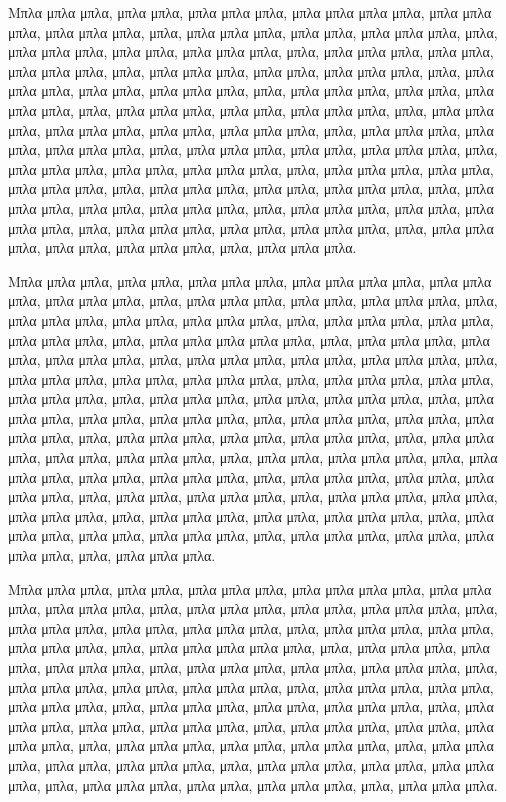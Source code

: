 \documentclass[diploma]{softlab-thesis}
\begin{document}
Μπλα μπλα μπλα, μπλα μπλα, μπλα μπλα μπλα, μπλα μπλα μπλα μπλα,
μπλα μπλα μπλα, μπλα μπλα μπλα, μπλα, μπλα μπλα μπλα, μπλα μπλα,
μπλα μπλα μπλα, μπλα, μπλα μπλα μπλα, μπλα μπλα, μπλα μπλα μπλα,
μπλα, μπλα μπλα μπλα, μπλα μπλα, μπλα μπλα μπλα, μπλα, μπλα μπλα
μπλα, μπλα μπλα, μπλα μπλα μπλα, μπλα, μπλα μπλα μπλα, μπλα μπλα,
μπλα μπλα μπλα, μπλα, μπλα μπλα μπλα, μπλα μπλα, μπλα μπλα μπλα,
μπλα, μπλα μπλα μπλα, μπλα μπλα, μπλα μπλα μπλα, μπλα, μπλα μπλα
μπλα, μπλα μπλα μπλα, μπλα μπλα, μπλα μπλα μπλα, μπλα, μπλα μπλα
μπλα, μπλα μπλα, μπλα μπλα μπλα, μπλα, μπλα μπλα μπλα, μπλα μπλα,
μπλα μπλα μπλα, μπλα, μπλα μπλα μπλα, μπλα μπλα, μπλα μπλα μπλα,
μπλα, μπλα μπλα μπλα, μπλα μπλα, μπλα μπλα μπλα, μπλα, μπλα μπλα
μπλα, μπλα μπλα, μπλα μπλα μπλα, μπλα, μπλα μπλα μπλα, μπλα μπλα,
μπλα μπλα μπλα, μπλα, μπλα μπλα μπλα, μπλα μπλα, μπλα μπλα μπλα,
μπλα, μπλα μπλα μπλα, μπλα μπλα, μπλα μπλα μπλα, μπλα, μπλα μπλα
μπλα, μπλα μπλα, μπλα μπλα μπλα, μπλα, μπλα μπλα μπλα.

Μπλα μπλα μπλα, μπλα μπλα, μπλα μπλα μπλα, μπλα μπλα μπλα μπλα,
μπλα μπλα μπλα, μπλα μπλα μπλα, μπλα, μπλα μπλα μπλα, μπλα μπλα,
μπλα μπλα μπλα, μπλα, μπλα μπλα μπλα, μπλα μπλα, μπλα μπλα μπλα,
μπλα, μπλα μπλα μπλα, μπλα μπλα, μπλα μπλα μπλα, μπλα, μπλα μπλα
μπλα μπλα μπλα, μπλα, μπλα μπλα μπλα, μπλα μπλα, μπλα μπλα μπλα,
μπλα, μπλα μπλα μπλα, μπλα μπλα, μπλα μπλα μπλα, μπλα, μπλα μπλα
μπλα, μπλα μπλα, μπλα μπλα μπλα, μπλα, μπλα μπλα μπλα, μπλα μπλα,
μπλα μπλα μπλα, μπλα, μπλα μπλα μπλα, μπλα μπλα, μπλα μπλα μπλα,
μπλα, μπλα μπλα μπλα, μπλα μπλα, μπλα μπλα μπλα, μπλα, μπλα μπλα
μπλα, μπλα μπλα, μπλα μπλα μπλα, μπλα, μπλα μπλα μπλα, μπλα μπλα,
μπλα μπλα μπλα, μπλα, μπλα μπλα μπλα, μπλα μπλα, μπλα μπλα μπλα,
μπλα, μπλα μπλα, μπλα μπλα μπλα, μπλα, μπλα μπλα μπλα, μπλα μπλα,
μπλα μπλα μπλα, μπλα, μπλα μπλα μπλα, μπλα μπλα, μπλα μπλα μπλα,
μπλα, μπλα μπλα, μπλα μπλα μπλα, μπλα, μπλα μπλα μπλα, μπλα μπλα,
μπλα μπλα μπλα, μπλα, μπλα μπλα μπλα, μπλα μπλα, μπλα μπλα μπλα,
μπλα, μπλα μπλα μπλα, μπλα μπλα, μπλα μπλα μπλα, μπλα, μπλα μπλα
μπλα, μπλα μπλα, μπλα μπλα μπλα, μπλα, μπλα μπλα μπλα.

Μπλα μπλα μπλα, μπλα μπλα, μπλα μπλα μπλα, μπλα μπλα μπλα μπλα,
μπλα μπλα μπλα, μπλα μπλα μπλα, μπλα, μπλα μπλα μπλα, μπλα μπλα,
μπλα μπλα μπλα, μπλα, μπλα μπλα μπλα, μπλα μπλα, μπλα μπλα μπλα,
μπλα, μπλα μπλα μπλα, μπλα μπλα, μπλα μπλα μπλα, μπλα, μπλα μπλα
μπλα μπλα μπλα, μπλα, μπλα μπλα μπλα, μπλα μπλα, μπλα μπλα μπλα,
μπλα, μπλα μπλα μπλα, μπλα μπλα, μπλα μπλα μπλα, μπλα, μπλα μπλα
μπλα, μπλα μπλα, μπλα μπλα μπλα, μπλα, μπλα μπλα μπλα, μπλα μπλα,
μπλα μπλα μπλα, μπλα, μπλα μπλα μπλα, μπλα μπλα, μπλα μπλα μπλα,
μπλα, μπλα μπλα μπλα, μπλα μπλα, μπλα μπλα μπλα, μπλα, μπλα μπλα
μπλα, μπλα μπλα, μπλα μπλα μπλα, μπλα, μπλα μπλα μπλα, μπλα μπλα,
μπλα μπλα μπλα, μπλα, μπλα μπλα μπλα, μπλα μπλα, μπλα μπλα μπλα,
μπλα, μπλα μπλα μπλα, μπλα μπλα, μπλα μπλα μπλα, μπλα, μπλα μπλα
μπλα, μπλα μπλα, μπλα μπλα μπλα, μπλα, μπλα μπλα μπλα.
\end{document}
